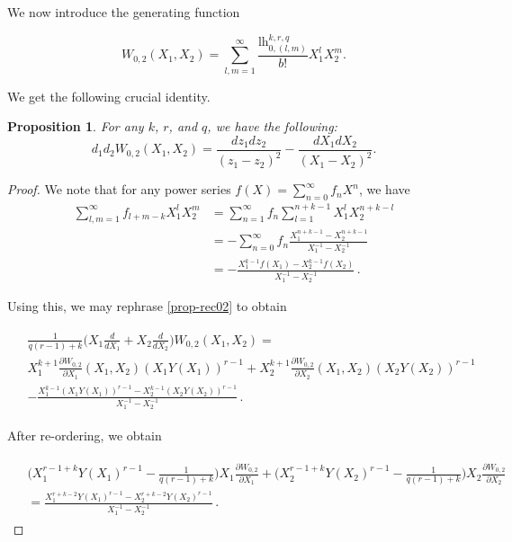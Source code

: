 \documentclass[10pt,a4paper,oneside,no-math,reqno]{amsart}%
\theoremstyle{plain}
\newtheorem{proposition}[theorem]{Proposition}
\theoremstyle{definition}
\theoremstyle{remark}
\numberwithin{equation}{section}
\newcommand{\1}{\mathds{1}}
\newcommand{\<}{\langle}
\renewcommand{\>}{\rangle}
\newcommand{\lh}{\mathord{\mathrm{l\!h}}}
\begin{document}
We now introduce the generating function

\begin{equation}
W_{0,2}(X_1,X_2)=\sum_{l,m=1}^\infty\frac{\lh_{0,(l,m)}^{k,r,q}}{b!}X_1^lX_2^m.
\end{equation}

We get the following crucial identity.

\begin{proposition}\label{Semistable}
For any $k$, $r$, and $q$, we have the following:
\begin{equation}
\label{equ-02}
d_1d_2W_{0,2}(X_1,X_2)=\frac{dz_1dz_2}{(z_1-z_2)^2}-\frac{dX_1dX_2}{(X_1-X_2)^2}.
\end{equation}
\end{proposition}

\begin{proof}
We note that for any power series $ f(X) = \sum_{n=0}^\infty f_n X^n$, we have
    \begin{equation}
    	\begin{split}
    		\sum_{l,m =1}^\infty f_{l+m-k} X_1^l X_2^m 
    		&=
    		\sum_{n=1}^\infty f_n \sum_{l = 1}^{n+k-1} X_1^l X_2^{n+k-l} 
    		\\
    		&= 
    		-\sum_{n=0}^\infty f_n \frac{X_1^{n+k-1} - X_2^{n+k-1}}{X_1^{-1}-X_2^{-1}}
    		\\
    		&= - \frac{X_1^{k-1} f(X_1) - X_2^{k-1} f(X_2)}{X_1^{-1} - X_2^{-1}}\,.
    	\end{split}
    \end{equation}

    Using this, we may rephrase \cref{prop-rec02} to obtain

    \begin{align}
    \begin{split}
         &\frac{1}{q(r-1)+k} \Big( X_1 \frac{d}{dX_1} + X_2 \frac{d}{dX_2} \Big) W_{0,2} (X_1,X_2)
      =\\
      &X_1^{k+1} \frac{\partial W_{0,2}}{\partial X_1} (X_1,X_2) (X_1 Y(X_1))^{r-1} + X_2^{k+1} \frac{\partial W_{0,2}}{\partial X_2}(X_1,X_2) (X_2 Y(X_2))^{r-1}
      \\
      &  - 
      \frac{ X_1^{k-1} (X_1 Y(X_1))^{r-1} - X_2^{k-1} (X_2 Y(X_2))^{r-1}}{X_1^{-1} - X_2^{-1}} \,.
      \end{split}
    \end{align}

    After re-ordering, we obtain

    \begin{align}
    \begin{split}
        &\Big(X_1^{r-1+k} Y(X_1)^{r-1} - \frac{1}{q(r-1)+k}\Big) X_1 \frac{\partial W_{0,2}}{\partial X_1} + \Big( X_2^{r-1+k} Y(X_2)^{r-1} - \frac{1}{q(r-1)+k} \Big) X_2 \frac{\partial W_{0,2}}{\partial X_2} \\
        &= \frac{X_1^{r+k-2} Y(X_1)^{r-1} - X_2^{r+k-2} Y(X_2)^{r-1}}{X_1^{-1} - X_2^{-1}} \,.
    \end{split}
    \end{align}


\end{proof}
\end{document}

